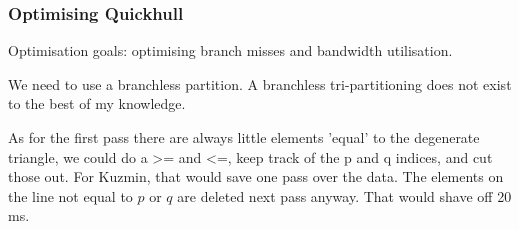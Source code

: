 \subsubsection{Optimising Quickhull}

Optimisation goals: optimising branch misses and bandwidth utilisation.

We need to use a branchless partition. A branchless tri-partitioning does not 
exist to the best of my knowledge.

As for the first pass there are always little elements 'equal' to the degenerate
triangle, we could do a >= and <=, keep track of the p and q indices, and cut
those out. For Kuzmin, that would save one pass over the data. The elements on
the line not equal to $p$ or $q$ are deleted next pass anyway. That would shave
off 20 ms.
\fi
